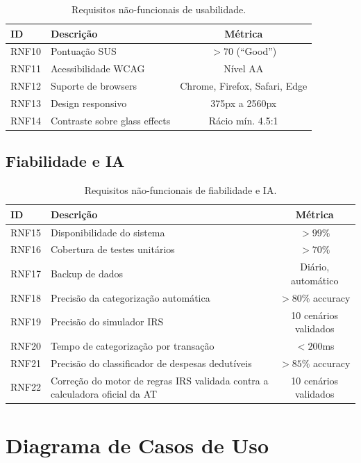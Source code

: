 \begin{table}[H]
\centering
\caption{Requisitos não-funcionais de usabilidade.}
\label{tab:rnf-usab}
\begin{tabularx}{\textwidth}{l X c}
\toprule
\textbf{ID} & \textbf{Descrição} & \textbf{Métrica} \\
\midrule
RNF10 & Pontuação \ac{SUS} & $> 70$ (``Good'') \\
RNF11 & Acessibilidade \ac{WCAG} & Nível AA \\
RNF12 & Suporte de browsers & Chrome, Firefox, Safari, Edge \\
RNF13 & Design responsivo & 375px a 2560px \\
RNF14 & Contraste sobre glass effects & Rácio mín. 4.5:1 \\
\bottomrule
\end{tabularx}
\end{table}

\subsection{Fiabilidade e IA}

\begin{table}[H]
\centering
\caption{Requisitos não-funcionais de fiabilidade e IA.}
\label{tab:rnf-fiab}
\begin{tabularx}{\textwidth}{l X c}
\toprule
\textbf{ID} & \textbf{Descrição} & \textbf{Métrica} \\
\midrule
RNF15 & Disponibilidade do sistema & $> 99\%$ \\
RNF16 & Cobertura de testes unitários & $> 70\%$ \\
RNF17 & Backup de dados & Diário, automático \\
RNF18 & Precisão da categorização automática & $> 80\%$ accuracy \\
RNF19 & Precisão do simulador \ac{IRS} & 10 cenários validados \\
RNF20 & Tempo de categorização por transação & $< 200$ms \\
RNF21 & Precisão do classificador de despesas dedutíveis & $> 85\%$ accuracy \\
RNF22 & Correção do motor de regras \ac{IRS} validada contra a calculadora oficial da \ac{AT} & 10 cenários validados \\
\bottomrule
\end{tabularx}
\end{table}


\section{Diagrama de Casos de Uso}
\label{sec:req-casos-uso}

